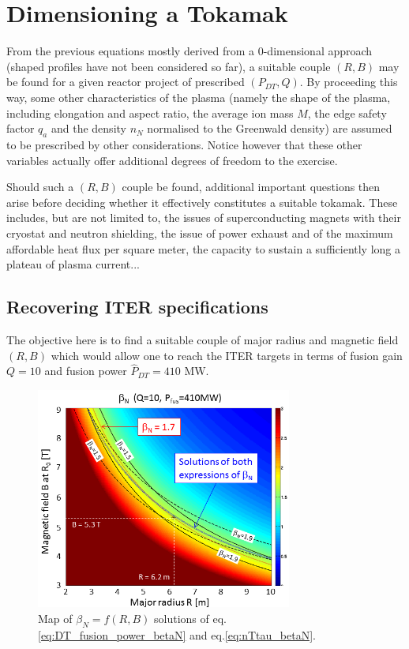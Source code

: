 \section{Dimensioning a Tokamak}
From the previous equations mostly derived from a 0-dimensional approach (shaped profiles have not been considered so far), a suitable couple $(R, B)$ may be found for a given reactor project of prescribed $(P_{DT}, Q)$. By proceeding this way, some other characteristics of the plasma (namely the shape of the plasma, including elongation and aspect ratio, the average ion mass $\hat M$, the edge safety factor $q_a$ and the density $n_N$ normalised to the Greenwald density) are assumed to be prescribed by other considerations. Notice however that these other variables actually offer additional degrees of freedom to the exercise.

Should such a $(R, B)$ couple be found, additional important questions then arise before deciding whether it effectively constitutes a suitable tokamak. These includes, but are not limited to, the issues of superconducting magnets with their cryostat and neutron shielding, the issue of power exhaust and of the maximum affordable heat flux per square meter, the capacity to sustain a sufficiently long a plateau of plasma current...\\

\subsection{Recovering ITER specifications}
\label{sec:ITER_spec}

The objective here is to find a suitable couple of major radius and magnetic field $(R,B)$ which would allow one to reach the ITER targets in terms of fusion gain $Q=10$ and fusion power $\hat P_{DT}=410$ MW.

\begin{figure} 
	\begin{center}
		\includegraphics[width=0.75\textwidth]{figures/Fig_2D_betaN_R_B_ITER_ok.png}
		\caption{Map of $\beta_N=f(R,B)$ solutions of eq.\ref{eq:DT_fusion_power_betaN} and eq.\ref{eq:nTtau_betaN}.}
		\label{fig:solutions_betaN}
	\end{center}
\end{figure}


